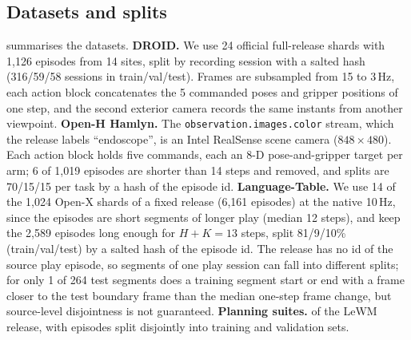\subsection{Datasets and splits}\label{app:data}

 summarises the datasets.
%
\textbf{DROID.} We use 24 official full-release shards with 1{,}126 episodes from 14 sites, split by recording session
with a salted hash (316/59/58 sessions in train/val/test).
%
Frames are subsampled from 15 to 3\,Hz, each action block concatenates the 5 commanded poses and gripper positions of
one step, and the second exterior camera records the same instants from another viewpoint.
%
\textbf{Open-H Hamlyn.} The \texttt{observation.images.color} stream, which the release labels ``endoscope'', is an Intel
RealSense scene camera ($848{\times}480$).
%
Each action block holds five commands, each an 8-D pose-and-gripper target per arm; 6 of 1{,}019 episodes are shorter
than 14 steps and removed, and splits are 70/15/15 per task by a hash of the episode id.
%
\textbf{Language-Table.} We use 14 of the 1{,}024 Open-X shards of a fixed release (6{,}161 episodes) at the native 10\,Hz, since
the episodes are short segments of longer play (median 12 steps), and keep the 2{,}589 episodes long enough for
$H{+}K{=}13$ steps, split 81/9/10\% (train/val/test) by a salted hash of the episode id.
%
The release has no id of the source play episode, so segments of one play session can fall into different splits; for
only 1 of 264 test segments does a training segment start or end with a frame closer to the test boundary frame than
the median one-step frame change, but source-level disjointness is not guaranteed.
%
\textbf{Planning suites.}  of the LeWM release, with episodes split
disjointly into training and validation sets.

